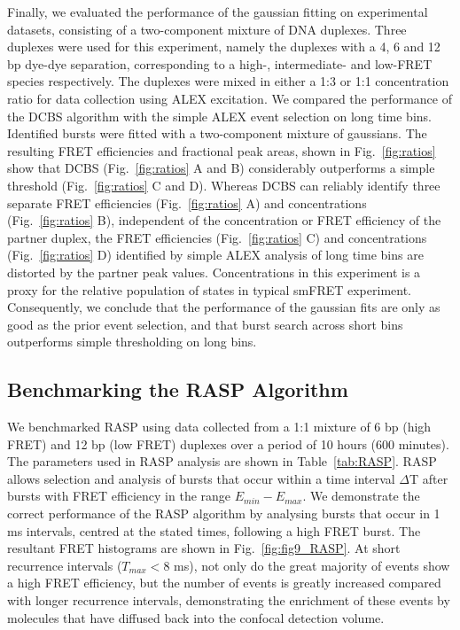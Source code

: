 Finally, we evaluated the performance of the gaussian fitting on experimental datasets, consisting of a two-component mixture of DNA duplexes. Three duplexes were used for this experiment, namely the duplexes with a 4, 6 and 12 bp dye-dye separation, corresponding to a high-, intermediate- and low-FRET species respectively. The duplexes were mixed in either a 1:3 or 1:1 concentration ratio for data collection using ALEX excitation. We compared the performance of the DCBS algorithm with the simple ALEX event selection on long time bins. Identified bursts were fitted with a two-component mixture of gaussians. The resulting FRET efficiencies and fractional peak areas, shown in Fig.~\ref{fig:ratios} show that DCBS (Fig.~\ref{fig:ratios} A and B) considerably outperforms a simple threshold (Fig.~\ref{fig:ratios} C and D). Whereas DCBS can reliably identify three separate FRET efficiencies (Fig.~\ref{fig:ratios} A) and concentrations (Fig.~\ref{fig:ratios} B), independent of the concentration or FRET efficiency of the partner duplex, the FRET efficiencies (Fig.~\ref{fig:ratios} C) and concentrations (Fig.~\ref{fig:ratios} D) identified by simple ALEX analysis of long time bins are distorted by the partner peak values. Concentrations in this experiment is a proxy for the relative population of states in typical smFRET experiment. Consequently, we conclude that the performance of the gaussian fits are only as good as the prior event selection, and that burst search across short bins outperforms simple thresholding on long bins.

\subsection*{Benchmarking the RASP Algorithm}    
We benchmarked RASP using data collected from a 1:1 mixture of 6 bp (high FRET) and 12 bp (low FRET) duplexes over a period of 10 hours (600 minutes). The parameters used in RASP analysis are shown in Table~\ref{tab:RASP}. RASP allows selection and analysis of bursts that occur within a time interval $\Delta$T after bursts with FRET efficiency in the range $E_{min} - E_{max}$. We demonstrate the correct performance of the RASP algorithm by analysing bursts that occur in 1 ms intervals, centred at the stated times, following a high FRET burst. The resultant FRET histograms are shown in Fig.~\ref{fig:fig9_RASP}. At short recurrence intervals ($T_{max} < 8$ ms), not only do the great majority of events show a high FRET efficiency, but the number of events is greatly increased compared with longer recurrence intervals, demonstrating the enrichment of these events by molecules that have diffused back into the confocal detection volume. 

